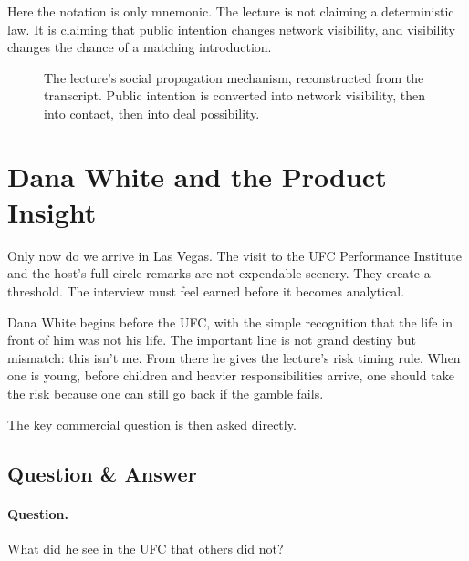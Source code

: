 Here the notation is only mnemonic. The lecture is not claiming a deterministic law. It is claiming that public intention changes network visibility, and visibility changes the chance of a matching introduction.

\begin{figure}[h]
\centering
{}
\caption{The lecture's social propagation mechanism, reconstructed from the transcript. Public intention is converted into network visibility, then into contact, then into deal possibility.}
\end{figure}

\section{Dana White and the Product Insight}

Only now do we arrive in Las Vegas. The visit to the UFC Performance Institute and the host's full-circle remarks are not expendable scenery. They create a threshold. The interview must feel earned before it becomes analytical.

Dana White begins before the UFC, with the simple recognition that the life in front of him was not his life. The important line is not grand destiny but mismatch: this isn't me. From there he gives the lecture's risk timing rule. When one is young, before children and heavier responsibilities arrive, one should take the risk because one can still go back if the gamble fails.

The key commercial question is then asked directly.

\subsection{Question \& Answer}

\paragraph{Question.}
What did he see in the UFC that others did not?

